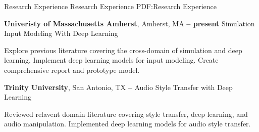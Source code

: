 \Section
{Research Experience}
{Research Experience}
{PDF:Research Experience}

\Entry
\textbf{Univeristy of Massachusetts Amherst},
Amherst, MA 
\dotfill
\textbf{ -- present}
\Gap
Simulation Input Modeling With Deep Learning
\begin{Detail}
    \SubBulletItem
    Explore previous literature covering the cross-domain of simulation and deep learning.
    \SubBulletItem
    Implement deep learning models for input modeling.
    \SubBulletItem
    Create comprehensive report and prototype model.
\end{Detail}

\BigGap
\Entry
\textbf{Trinity University},
San Antonio, TX
\dotfill
\textbf{ -- }
\Gap
Audio Style Transfer with Deep Learning
\begin{Detail}
    \SubBulletItem
    Reviewed relavent domain literature covering style transfer, deep learning, and audio manipulation.
    \SubBulletItem
    Implemented deep learning models for audio style transfer.
\end{Detail}